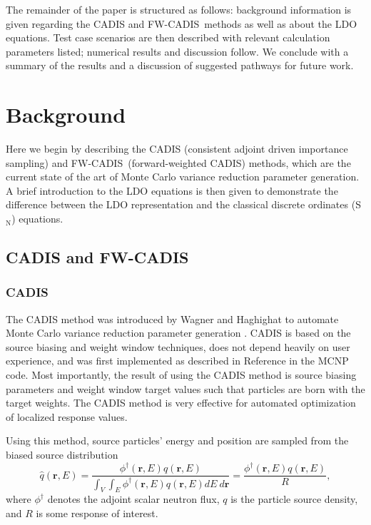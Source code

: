 \documentclass{article} %
\newcommand{\vecr}{\textbf{r}}
\newcommand{\sn}{S$_\mathrm{N}$}
\newcommand{\qhat}{\ensuremath{\hat{q}}}
\newcommand{\fwc}{\mbox{FW-CADIS}}
\begin{document}
The remainder of the paper is structured as follows: background information is
given regarding the CADIS and \fwc\ methods as well as about the LDO
equations. Test case scenarios are then described with relevant calculation
parameters listed; numerical results and discussion follow. We conclude with a
summary of the results and a discussion of suggested pathways for future work.

\section{Background}
\label{sec:background}

Here we begin by describing the CADIS (consistent adjoint driven importance
sampling) and \fwc\ (forward-weighted CADIS) methods, which are the current
state of the art of Monte Carlo variance reduction parameter generation. A
brief introduction to the LDO equations is then given to demonstrate
the difference between the LDO representation and the classical discrete
ordinates (\sn) equations.

\subsection{CADIS and \fwc}

\subsubsection{CADIS}

The CADIS method was introduced by Wagner and Haghighat to automate Monte
Carlo variance reduction parameter generation \cite{cadis}. CADIS is based on
the source biasing and weight window techniques, does not depend heavily on
user experience, and was first implemented as described in Reference
\cite{cadis} in the MCNP code. Most importantly, the result of using the CADIS
method is source biasing parameters and weight window target values such that
particles are born with the target weights. The CADIS method is very effective
for automated optimization of localized response values.

Using this method, source particles' energy and position are sampled from the
biased source distribution
%
\begin{equation}
\qhat(\vecr,E) = 
\frac{\phi^{\dagger}(\vecr,E)q(\vecr,E)}
{\int_V\int_E\phi^{\dagger}(\vecr,E)q(\vecr,E) dE\ d\vecr} 
= \frac{\phi^{\dagger}(\vecr,E)q(\vecr,E)}{R},
\label{eq:cadis_sb}
\end{equation}
%
where $\phi^{\dagger}$ denotes the adjoint scalar neutron flux, $q$
is the particle source density, and $R$ is some response of interest.
\end{document}
